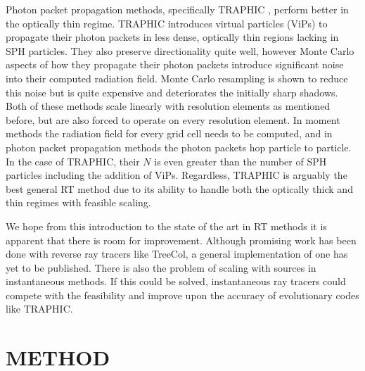 \documentclass[fleq,usenatbib]{mnras}
\begin{document}
Photon packet propagation methods, specifically TRAPHIC 
\citep{pawlikSchaye08}, perform better in the optically thin regime. TRAPHIC 
introduces virtual particles (ViPs) to propagate their photon packets in less 
dense, optically thin regions lacking in SPH particles. They also preserve 
directionality quite well, however Monte Carlo aspects of how they propagate 
their photon packets introduce significant noise into their computed radiation 
field. Monte Carlo resampling is shown to reduce this noise but is quite 
expensive and deteriorates the initially sharp shadows. Both of these methods 
scale linearly with resolution elements as mentioned before, but are also 
forced to operate on every resolution element. In moment methods the radiation 
field for every grid cell needs to be computed, and in photon packet 
propagation methods the photon packets hop particle to particle. In the case 
of TRAPHIC, their $N$ is even greater than the number of SPH particles 
including the addition of ViPs. Regardless, TRAPHIC is arguably the best 
general RT method due to its ability to handle both the optically thick and 
thin regimes with feasible scaling.

We hope from this introduction to the state of the art in RT methods it is 
apparent that there is room for improvement. Although promising work has been 
done with reverse ray tracers like TreeCol, a general implementation of one 
has yet to be published. There is also the problem of scaling with sources in 
instantaneous methods. If this could be solved, instantaneous ray tracers 
could compete with the feasibility and improve upon the accuracy of 
evolutionary codes like TRAPHIC.

\section{METHOD}\label{sec:mthd}
\end{document}
